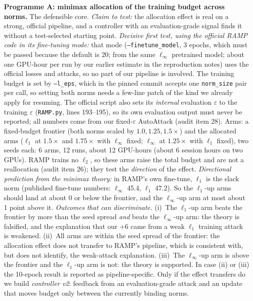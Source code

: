 \documentclass[11pt]{article}
\begin{document}
\textbf{Programme A: minimax allocation of the training budget across norms.} The defensible core.
\emph{Claim to test:} the allocation effect is real on a strong, official pipeline, and a controller with an evaluation-grade signal finds it without a test-selected starting point.
\emph{Decisive first test, using the official RAMP code in its fine-tuning mode:} that mode (\texttt{--finetune\_model}, 3 epochs, which must be passed because the default is 20; from the same $\ell_\infty$ pretrained model; about one GPU-hour per run by our earlier estimate in the reproduction notes) uses the official losses and attacks, so no part of our pipeline is involved. The training budget is set by \texttt{--l\_eps}, which in the pinned commit accepts one \texttt{norm\_size} pair per call, so setting both norms needs a few-line patch of the kind we already apply for resuming. The official script also sets its \emph{internal} evaluation $\varepsilon$ to the training $\varepsilon$ (\texttt{RAMP.py}, lines 193--195), so its own evaluation output must never be reported; all numbers come from our fixed-$\varepsilon$ AutoAttack (audit item 28).
Arms: a fixed-budget frontier (both norms scaled by $1.0,1.25,1.5\times$) and the allocated arms ($\ell_1$ at $1.5\times$ and $1.75\times$ with $\ell_\infty$ fixed; $\ell_\infty$ at $1.25\times$ with $\ell_1$ fixed), two seeds each: 6 arms, 12 runs, about 12 GPU-hours (about 6 session hours on two GPUs). RAMP trains no $\ell_2$, so these arms raise the total budget and are not a reallocation (audit item 26); they test the \emph{direction} of the effect.
\emph{Directional prediction from the minimax theory:} in RAMP's own fine-tune, $\ell_1$ is the slack norm (published fine-tune numbers: $\ell_\infty$ 45.4, $\ell_1$ 47.2). So the $\ell_1$-up arms should land at about 0 or below the frontier, and the $\ell_\infty$-up arm at most about 1 point above it.
\emph{Outcomes that can discriminate.} (i)~The $\ell_1$-up arm beats the frontier by more than the seed spread \emph{and} beats the $\ell_\infty$-up arm: the theory is falsified, and the explanation that our $+6$ came from a weak $\ell_1$ training attack is weakened. (ii)~All arms are within the seed spread of the frontier: the allocation effect does not transfer to RAMP's pipeline, which is consistent with, but does not identify, the weak-attack explanation. (iii)~The $\ell_\infty$-up arm is above the frontier and the $\ell_1$-up arm is not: the theory is supported. In case (ii) or (iii) the 10-epoch result is reported as pipeline-specific.
Only if the effect transfers do we build \emph{controller v2}: feedback from an evaluation-grade attack and an update that moves budget only between the currently binding norms.
\end{document}
